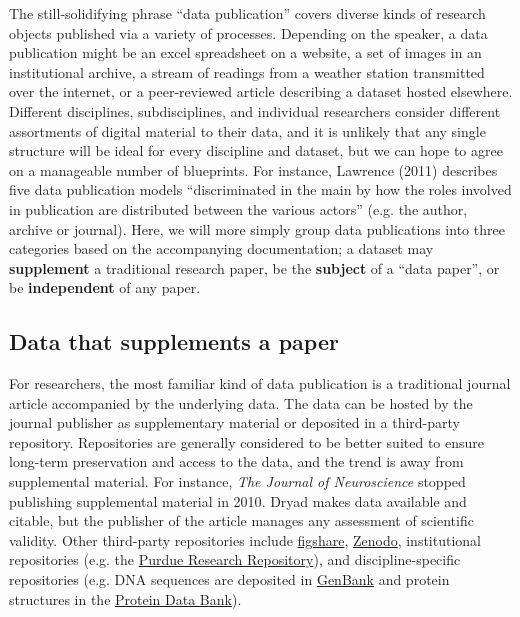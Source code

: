 \documentclass[10pt,twocolumn]{article}
\begin{document}
The still-solidifying phrase ``data publication'' covers diverse kinds of research objects published via a variety of processes.
Depending on the speaker, a data publication might be an excel spreadsheet on a website, a set of images in an institutional archive, a stream of readings from a weather station transmitted over the internet, or a peer-reviewed article describing a dataset hosted elsewhere.
Different disciplines, subdisciplines, and individual researchers consider different assortments of digital material to their data, and it is unlikely that any single structure will be ideal for every discipline and dataset, but we can hope to agree on a manageable number of blueprints.
For instance, Lawrence (2011) describes five data publication models ``discriminated in the main by how the roles involved in publication are distributed between the various actors'' (e.g. the author, archive or journal).\cite{lawrence_data_2011}
Here, we will more simply group data publications into three categories based on the accompanying documentation; a dataset may \textbf{supplement} a traditional research paper, be the \textbf{subject} of a ``data paper'', or be \textbf{independent} of any paper.

\subsection*{Data that supplements a paper}\label{paper-supplement-data}

For researchers, the most familiar kind of data publication is a traditional journal article accompanied by the underlying data.
The data can be hosted by the journal publisher as supplementary material or deposited in a third-party repository.
Repositories are generally considered to be better suited to ensure long-term preservation and access to the data, and the trend is away from supplemental material. 
For instance, \emph{The Journal of Neuroscience} stopped publishing supplemental material in 2010\cite{maunsell_announcement_2010}. 
Dryad makes data available and citable, but the publisher of the article manages any assessment of scientific validity.
Other third-party repositories include \href{http://figshare.com/}{figshare}, \href{http://zenodo.org/}{Zenodo}, institutional repositories (e.g. the \href{https://purr.purdue.edu/}{Purdue Research Repository}), and discipline-specific repositories (e.g. DNA sequences are deposited in \href{http://www.ncbi.nlm.nih.gov/genbank/}{GenBank}\cite{benson_genbank_2013} and protein structures in the \href{http://www.rcsb.org/}{Protein Data Bank}\cite{berman_protein_2000}).
\end{document}
